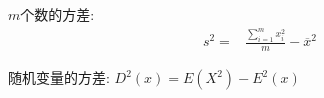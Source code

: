 $m$个数的方差: 
$$\begin{aligned}s^2=&\frac{\sum_{i=1}^m x_i^2}m-\overline x^2\end{aligned}$$

随机变量的方差: $D^2(x)=E(X^2)-E^2(x)$